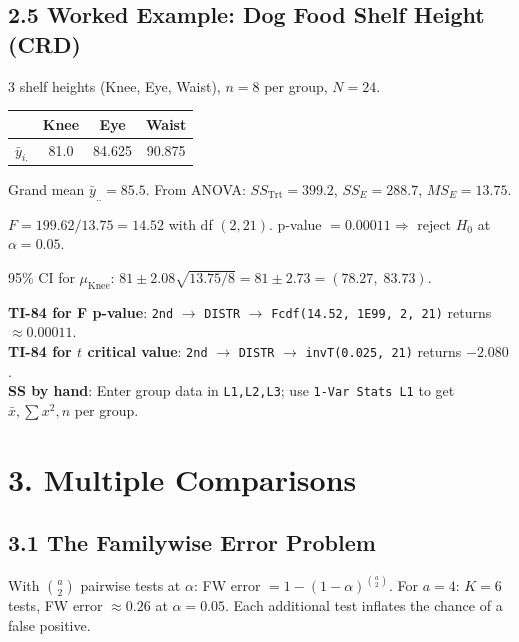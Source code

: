 \documentclass[9pt,letterpaper]{article}
\begin{document}
\subsection{2.5 Worked Example: Dog Food Shelf Height (CRD)}

3 shelf heights (Knee, Eye, Waist), $n=8$ per group, $N=24$.

\begin{center}\small
\begin{tabular}{@{}lccc@{}}
\toprule
 & Knee & Eye & Waist \\
\midrule
$\bar{y}_{i.}$ & 81.0 & 84.625 & 90.875 \\
\bottomrule
\end{tabular}
\end{center}

Grand mean $\bar{y}_{..} = 85.5$. From ANOVA: $SS_{\text{Trt}}=399.2$, $SS_E=288.7$, $MS_E=13.75$.

$F = 199.62/13.75 = 14.52$ with df $(2, 21)$. p-value $= 0.00011 \Rightarrow$ reject $H_0$ at $\alpha=0.05$.

95\% CI for $\mu_{\text{Knee}}$: $81 \pm 2.08\sqrt{13.75/8} = 81 \pm 2.73 = (78.27,\; 83.73)$.

\begin{calcbox}
\textbf{TI-84 for F p-value}: \texttt{2nd} $\to$ \texttt{DISTR} $\to$ \texttt{Fcdf(14.52, 1E99, 2, 21)} returns $\approx 0.00011$.\\
\textbf{TI-84 for $t$ critical value}: \texttt{2nd} $\to$ \texttt{DISTR} $\to$ \texttt{invT(0.025, 21)} returns $-2.080$.\\
\textbf{SS by hand}: Enter group data in \texttt{L1,L2,L3}; use \texttt{1-Var Stats L1} to get $\bar{x}, \sum x^2, n$ per group.
\end{calcbox}

\section{3. Multiple Comparisons}

\subsection{3.1 The Familywise Error Problem}
With $\binom{a}{2}$ pairwise tests at $\alpha$: FW error $= 1-(1-\alpha)^{\binom{a}{2}}$. For $a=4$: $K=6$ tests, FW error $\approx 0.26$ at $\alpha=0.05$. Each additional test inflates the chance of a false positive.
\end{document}
